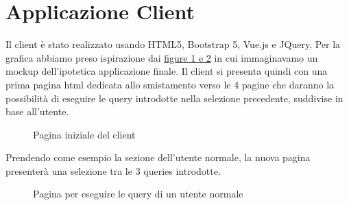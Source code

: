 \documentclass[12pt]{article}
\begin{document}
\newpage
\section{Applicazione Client}
Il client è stato realizzato usando HTML5, Bootstrap 5, Vue.js e JQuery. Per la grafica abbiamo preso ispirazione dai \hyperref[sec:mockupFinali]{figure 1 e 2} in cui immaginavamo un mockup dell'ipotetica applicazione finale.
\newline
Il client si presenta quindi con una prima pagina html dedicata allo smistamento verso le 4 pagine che daranno la possibilità di eseguire le query introdotte nella selezione precedente, suddivise in base all'utente. 
\begin{figure}[H]
    \caption{Pagina iniziale del client}
\end{figure}
Prendendo come esempio la sezione dell'utente normale, la nuova pagina presenterà una selezione tra le 3 queries introdotte.
\begin{figure}[H]
    \caption{Pagina per eseguire le query di un utente normale}
\end{figure}
\end{document}
